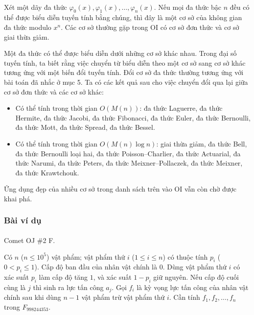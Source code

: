 \documentclass[11pt]{article}
\begin{document}
\paragraph{}
Xét một dãy đa thức \(\varphi_0(x),\varphi_1(x),\ldots,\varphi_n(x)\). Nếu mọi
đa thức bậc \(n\) đều có thể được biểu diễn tuyến tính bằng chúng, thì đây là
một cơ sở của không gian đa thức modulo \(x^n\). Các cơ sở thường gặp trong OI
có cơ sở đơn thức và cơ sở giai thừa giảm.

Một đa thức có thể được biểu diễn dưới những cơ sở khác nhau. Trong đại số tuyến
tính, ta biết rằng việc chuyển từ biểu diễn theo một cơ sở sang cơ sở khác
tương ứng với một biến đổi tuyến tính. Đổi cơ sở đa thức thường tương ứng với
bài toán đã nhắc ở mục 5. Ta có các kết quả sau cho việc chuyển đổi qua lại
giữa cơ sở đơn thức và các cơ sở khác:

\begin{itemize}
  \item Có thể tính trong thời gian \(O(M(n))\): đa thức Laguerre, đa thức
  Hermite, đa thức Jacobi, đa thức Fibonacci, đa thức Euler, đa thức Bernoulli,
  đa thức Mott, đa thức Spread, đa thức Bessel.
  \item Có thể tính trong thời gian \(O(M(n)\log n)\): giai thừa giảm, đa thức
  Bell, đa thức Bernoulli loại hai, đa thức Poisson--Charlier, đa thức
  Actuarial, đa thức Narumi, đa thức Peters, đa thức Meixner--Pollaczek, đa
  thức Meixner, đa thức Krawtchouk.
\end{itemize}

Ứng dụng đẹp của nhiều cơ sở trong danh sách trên vào OI vẫn còn chờ được khai
phá.

\subsubsection{Bài ví dụ}

\paragraph{}
 Comet OJ \#2 F.

 Có \(n\) (\(n\le 10^5\)) vật phẩm; vật phẩm thứ \(i\)
(\(1\le i\le n\)) có thuộc tính \(p_i\) (\(0<p_i\le 1\)). Cấp độ ban đầu của
nhân vật chính là \(0\). Dùng vật phẩm thứ \(i\) có xác suất \(p_i\) làm cấp độ
tăng \(1\), và xác suất \(1-p_i\) giữ nguyên. Nếu cấp độ cuối cùng là \(j\) thì
sinh ra lực tấn công \(a_j\). Gọi \(f_i\) là kỳ vọng lực tấn công của nhân vật
chính sau khi dùng \(n-1\) vật phẩm trừ vật phẩm thứ \(i\). Cần tính
\(f_1,f_2,\ldots,f_n\) trong \(F_{998244353}\).
\end{document}
